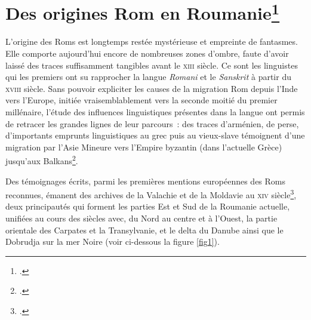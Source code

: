 \documentclass[a4paper,12pt,twoside]{book}
\newcommand{\siecle}[1]{\textsc{#1}\ieme}
\begin{document}
	\let\@makeschapterhead\savedchap
    \makeatletter
	\vspace{-1cm}
    
    	\section*{Des origines Rom en Roumanie\footcites[Sur l'histoire de la Roumanie :][]{sanduHistoireRoumanie2008,durandinHistoireRoumains1995,castellanHistoirePeupleRoumain2002,iorgaHistoryRomaniaLand2019}}
            L'origine des Roms est longtemps restée mystérieuse et empreinte de fantasmes. Elle comporte aujourd'hui encore de nombreuses zones d'ombre, faute d'avoir laissé des traces suffisamment tangibles avant le \siecle{xiii} siècle. Ce sont les linguistes qui les premiers ont su rapprocher la langue \textit{Romani} et le \textit{Sanskrit} à partir du \siecle{xviii} siècle. Sans pouvoir expliciter les causes de la migration Rom depuis l'Inde vers l'Europe, initiée vraisemblablement vers la seconde moitié du premier millénaire, l'étude des influences linguistiques présentes dans la langue ont permis de retracer les grandes lignes de leur parcours~: des traces d'arménien, de perse, d'importants emprunts linguistiques au grec puis au vieux-slave témoignent d'une migration par l'Asie Mineure vers l'Empire byzantin (dans l'actuelle Grèce) jusqu'aux Balkans\footcites[Quelques références détaillant ces aspects :][voir également les fiches d'informations sur l'histoire des Roms du Conseil de l'Europe : https://www.coe.int/fr/web/roma-and-travellers/roma-history-factsheets (visité le 19/08/2022).  ]{achimRomaRomanianHistory2004,marushiakovaGypsySlaveryWallachia2013,fraserGypsies1995,hubschmannovaWhatCanSociology1972,kenrickGypsiesGangesThames2004,kenrickHistoricalDictionaryGypsies1998,liegeoisRomsTsiganes2019,matrasRomaniLinguisticIntroduction2002,urtizbereaMyologyEthnicMinorities2015}.
    			    
			    
	        Des témoignages écrits, parmi les premières mentions européennes des Roms reconnues, émanent des archives de la Valachie et de la Moldavie au \siecle{xiv} siècle\footcites(Des donations d'esclaves en 1385 en Valachie et en 1428 en Moldavie, voir  :)()[p.~2]{marushiakovaGypsySlaveryWallachia2013}[][p.~10]{achimRomaRomanianHistory2004}, deux principautés qui forment les parties Est et Sud de la Roumanie actuelle, unifiées au cours des siècles avec, du Nord au centre et à l'Ouest, la partie orientale des Carpates et la Transylvanie, et le delta du Danube ainsi que le Dobrudja sur la mer Noire (voir ci-dessous la figure \ref{fig1}).
			\pagebreak
\end{document}
